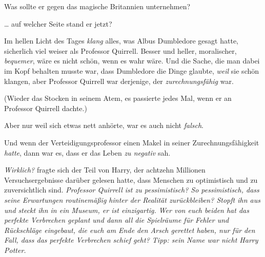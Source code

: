 Was sollte er gegen das magische Britannien unternehmen?

… auf welcher Seite stand er jetzt?

Im hellen Licht des Tages \emph{klang} alles, was Albus Dumbledore gesagt hatte, sicherlich viel weiser als Professor Quirrell. Besser und heller, moralischer, \emph{bequemer}, wäre es nicht schön, wenn es wahr wäre. Und die Sache, die man dabei im Kopf behalten musste war, dass Dumbledore die Dinge glaubte, \emph{weil} sie schön klangen, aber Professor Quirrell war derjenige, der \emph{zurechnungsfähig} war.

(Wieder das Stocken in seinem Atem, es passierte jedes Mal, wenn er an Professor Quirrell dachte.)

Aber nur weil sich etwas nett anhörte, war es auch nicht \emph{falsch}.

Und wenn der Verteidigungsprofessor einen Makel in seiner Zurechnungsfähigkeit \emph{hatte}, dann war es, dass er das Leben \emph{zu negativ} sah.

\emph{Wirklich?} fragte sich der Teil von Harry, der achtzehn Millionen Versuchsergebnisse darüber gelesen hatte, dass Menschen zu optimistisch und zu zuversichtlich sind. \emph{Professor Quirrell ist zu pessimistisch? So pessimistisch, dass seine Erwartungen routinemäßig hinter der Realität \emph{zurückbleiben}? Stopft ihn aus und steckt ihn in ein Museum, er ist einzigartig. Wer von euch beiden hat das perfekte Verbrechen geplant und \emph{dann} all die Spielräume für Fehler und Rückschläge eingebaut, die euch am Ende den Arsch gerettet haben, nur für den Fall, dass das perfekte Verbrechen schief geht? Tipp: sein Name war nicht Harry Potter.}

